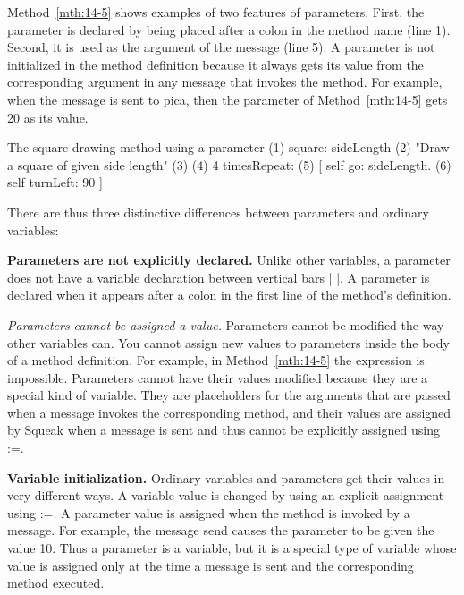 \documentclass[a4paper,10pt,twoside]{book}
\begin{document}
Method~\ref{mth:14-5} shows examples of two features of parameters. First, the parameter  is declared by being placed after a colon in the method name (line 1). Second, it is used 
as the argument of the message  (line 5). A parameter is not initialized in the method definition because it always gets its value from the corresponding argument in any message that 
invokes the method. For example, when the message  is sent to pica, then the 
parameter  of Method~\ref{mth:14-5} gets 20 as its value. 


\begin{method}[14-5]{The square-drawing method using a parameter}
(1) square: sideLength 
(2) "Draw a square of given side length" 
(3) 
(4) 4 timesRepeat: 
(5)      [ self go: sideLength. 
(6)      self turnLeft: 90 ] 
\end{method}

There are thus three distinctive differences between parameters and ordinary variables: 

\begin{description}
\item{\textbf{Parameters are not explicitly declared.}} Unlike other variables, a parameter does not 
have a variable declaration between vertical bars | |. A parameter is declared when it 
appears after a colon in the first line of the method’s definition. 

\item{\textit{Parameters cannot be assigned a value.}} Parameters cannot be modified the way other 
variables can. You cannot assign new values to parameters inside the body of a method 
definition. For example, in Method~\ref{mth:14-5} the expression  is impossible. 
Parameters cannot have their values modified because they are a special kind of variable. 
They are placeholders for the arguments that are passed when a message invokes the corresponding method, and their values are assigned by Squeak when a message is sent and thus cannot be explicitly assigned using :=. 

\item{\textbf{Variable initialization.}} Ordinary variables and parameters get their values in very different 
ways. A variable value is changed by using an explicit assignment using :=. A parameter 
value is assigned when the method is invoked by a message. For example, the message 
send  causes the parameter  to be given the value 10. Thus a 
parameter is a variable, but it is a special type of variable whose value is assigned only at 
the time a message is sent and the corresponding method executed. 
\end{description}
\end{document}
